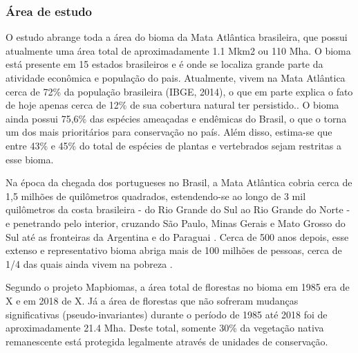 \documentclass[12pt,a4paper]{article}
\begin{document}
\subsubsection{Área de estudo}
\hspace{13pt} O estudo abrange toda a área do bioma da Mata Atlântica brasileira, que possui atualmente uma área total de aproximadamente 1.1 Mkm2 ou 110 Mha. O bioma está presente em 15 estados brasileiros e é onde se localiza grande parte da atividade econômica e população do pais. Atualmente, vivem na Mata Atlântica cerca de 72\% da população brasileira (IBGE, 2014), o que em parte explica o fato de hoje apenas cerca de 12\% de sua cobertura natural ter persistido.. O bioma ainda possui 75,6\% das espécies ameaçadas e endêmicas do Brasil, o que o torna um dos mais prioritários para conservação no país. Além disso, estima-se que entre 43\% e 45\% do total de espécies de plantas e vertebrados sejam restritas a esse bioma.

Na época da chegada dos portugueses no Brasil, a Mata Atlântica cobria cerca de 1,5 milhões de quilômetros quadrados, estendendo-se ao longo de 3 mil quilômetros da costa brasileira - do Rio Grande do Sul ao Rio Grande do Norte - e penetrando pelo interior, cruzando São Paulo, Minas Gerais e Mato Grosso do Sul até as fronteiras da Argentina e do Paraguai \citep{scarano2014}. Cerca de 500 anos depois, esse extenso e representativo bioma abriga mais de 100 milhões de pessoas, cerca de 1/4 das quais ainda vivem na pobreza \citep{scarano2014}.

Segundo o projeto Mapbiomas, a área total de florestas no bioma em 1985 era de X e em 2018 de X. Já a área de florestas que não sofreram mudanças significativas (pseudo-invariantes) durante o período de 1985 até 2018 foi de aproximadamente 21.4 Mha. Deste total, somente  30\% da vegetação nativa remanescente está protegida legalmente através de unidades de conservação.

\end{document}

